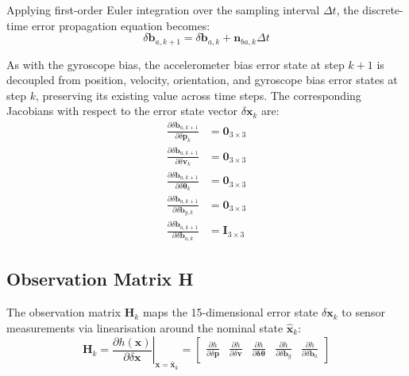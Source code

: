 \documentclass{article}
\begin{document}
	Applying first-order Euler integration over the sampling interval $\Delta t$, the discrete-time error propagation equation becomes:
	\begin{equation*}
		\delta\mathbf{b}_{a,k+1} = \delta\mathbf{b}_{a,k} + \mathbf{n}_{ba,k} \Delta t
	\end{equation*}
	
	As with the gyroscope bias, the accelerometer bias error state at step $k+1$ is decoupled from position, velocity, orientation, and gyroscope bias error states at step $k$, preserving its existing value across time steps. The corresponding Jacobians with respect to the error state vector $\delta\mathbf{x}_k$ are:
	\begin{align*}
		\frac{\partial \delta\mathbf{b}_{a,k+1}}{\partial \delta\mathbf{p}_k} &= \mathbf{0}_{3 \times 3} \\
		\frac{\partial \delta\mathbf{b}_{a,k+1}}{\partial \delta\mathbf{v}_k} &= \mathbf{0}_{3 \times 3} \\
		\frac{\partial \delta\mathbf{b}_{a,k+1}}{\partial \delta\bm{\theta}_k} &= \mathbf{0}_{3 \times 3} \\
		\frac{\partial \delta\mathbf{b}_{a,k+1}}{\partial \delta\mathbf{b}_{g,k}} &= \mathbf{0}_{3 \times 3} \\
		\frac{\partial \delta\mathbf{b}_{a,k+1}}{\partial \delta\mathbf{b}_{a,k}} &= \mathbf{I}_{3 \times 3}
	\end{align*}
	
	\subsection{Observation Matrix H}
	
	The observation matrix $\mathbf{H}_k$ maps the 15-dimensional error state $\delta\mathbf{x}_k$ to sensor measurements via linearisation around the nominal state $\hat{\mathbf{x}}_k$:
	\begin{equation*}
		\mathbf{H}_k = \left. \frac{\partial h(\mathbf{x})}{\partial \delta\mathbf{x}} \right|_{\mathbf{x} = \hat{\mathbf{x}}_k} = 
		\begin{bmatrix} 
			\frac{\partial h}{\partial \delta\mathbf{p}} & \frac{\partial h}{\partial \delta\mathbf{v}} & \frac{\partial h}{\partial \bm{\delta\theta}} & \frac{\partial h}{\partial \delta\mathbf{b}_g} & \frac{\partial h}{\partial \delta\mathbf{b}_a} 
		\end{bmatrix}
	\end{equation*}
	
\end{document}
